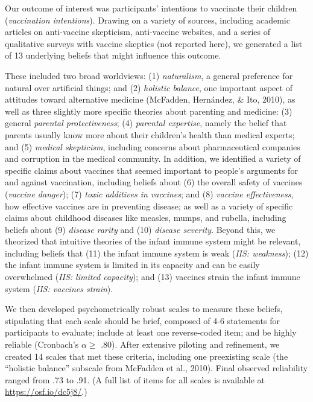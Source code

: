 \documentclass[10pt, letterpaper]{article}
\begin{document}
Our outcome of interest was participants' intentions to vaccinate their
children (\emph{vaccination intentions}). Drawing on a variety of
sources, including academic articles on anti-vaccine skepticism,
anti-vaccine websites, and a series of qualitative surveys with vaccine
skeptics (not reported here), we generated a list of 13 underlying
beliefs that might influence this outcome.

These included two broad worldviews: (1) \emph{naturalism}, a general
preference for natural over artificial things; and (2) \emph{holistic
balance}, one important aspect of attitudes toward alternative medicine
(McFadden, Hernández, \& Ito, 2010), as well as three slightly more
specific theories about parenting and medicine: (3) general
\emph{parental protectiveness}; (4) \emph{parental expertise}, namely
the belief that parents usually know more about their children's health
than medical experts; and (5) \emph{medical skepticism}, including
concerns about pharmaceutical companies and corruption in the medical
community. In addition, we identified a variety of specific claims about
vaccines that seemed important to people's arguments for and against
vaccination, including beliefs about (6) the overall safety of vaccines
(\emph{vaccine danger}); (7) \emph{toxic additives in vaccines}; and (8)
\emph{vaccine effectiveness}, how effective vaccines are in preventing
disease; as well as a variety of specific claims about childhood
diseases like measles, mumps, and rubella, including beliefs about (9)
\emph{disease rarity} and (10) \emph{disease severity}. Beyond this, we
theorized that intuitive theories of the infant immune system might be
relevant, including beliefs that (11) the infant immune system is weak
(\emph{IIS: weakness}); (12) the infant immune system is limited in its
capacity and can be easily overwhelmed (\emph{IIS: limited capacity});
and (13) vaccines strain the infant immune system (\emph{IIS: vaccines
strain}).

We then developed psychometrically robust scales to measure these
beliefs, stipulating that each scale should be brief, composed of 4-6
statements for participants to evaluate; include at least one
reverse-coded item; and be highly reliable (Cronbach's \(\alpha \geq\)
.80). After extensive piloting and refinement, we created 14 scales that
met these criteria, including one preexisting scale (the ``holistic
balance'' subscale from McFadden et al., 2010). Final observed
reliability ranged from .73 to .91. (A full list of items for all scales
is available at \url{https://osf.io/dc5j8/}.)
\end{document}
